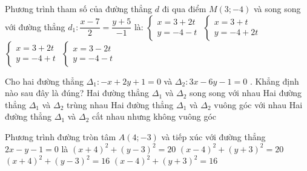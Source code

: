 \begin{ex}%
Phương trình tham số của đường thẳng $d$ đi qua điểm $M\left(3;-4\right)$ và song song với đường thẳng $d_1:\dfrac{x-7}{2}=\dfrac{y+5}{-1}$ là:
\choice
{\True $\left\{\begin{array}{l}
x=3+2t\\
y=-4-t
\end{array}\right.$}
{$\left\{\begin{array}{l}
x=3+t\\
y=-4+2t
\end{array}\right.$}
{$\left\{\begin{array}{l}
x=3+2t\\
y=-4+t
\end{array}\right.$}
{$\left\{\begin{array}{l}
x=3-2t\\
y=-4-t
\end{array}\right.$}
\end{ex}

\begin{ex}%
Cho hai đường thẳng $\Delta_1:-x+2y+1=0$ và $\Delta_2:3x-6y-1=0$ . Khẳng định nào sau đây là đúng?
\choice
{\True Hai đường thẳng $\Delta_1$ và $\Delta_2$ song song với nhau}
{Hai đường thẳng $\Delta_1$ và $\Delta_2$ trùng nhau}
{Hai đường thẳng $\Delta_1$ và $\Delta_2$ vuông góc với nhau}
{Hai đường thẳng $\Delta_1$ và $\Delta_2$ cắt nhau nhưng không vuông góc}
\end{ex}

\begin{ex}%
Phương trình đường tròn tâm $A\left(4;-3\right)$ và tiếp xúc với đường thẳng $2x-y-1=0$ là
\choice
{$\left(x+4\right)^2+\left(y-3\right)^2=20$}
{\True $\left(x-4\right)^2+\left(y+3\right)^2=20$}
{$\left(x+4\right)^2+\left(y-3\right)^2=16$}
{$\left(x-4\right)^2+\left(y+3\right)^2=16$}
\end{ex}

